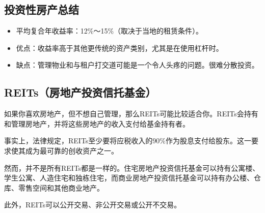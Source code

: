 \subsection{投资性房产总结}
\begin{itemize}
\item 平均复合年收益率：12\%～15\%（取决于当地的租赁条件）。
\item 优点：收益率高于其他更传统的资产类别，尤其是在使用杠杆时。
\item 缺点：管理物业和与租户打交道可能是一个令人头疼的问题。很难分散投资。
\end{itemize}
\subsection{REITs（房地产投资信托基金）}
如果你喜欢房地产，但不想自己管理，那么REITs可能比较适合你。REITs会持有和管理房地产，并将这些房地产的收入支付给基金持有者。

事实上，法律规定，REITs至少要将应税收入的90\%作为股息支付给股东。这一要求使其成为最可靠的创收资产之一。

然而，并不是所有REITs都是一样的。住宅房地产投资信托基金可以持有公寓楼、学生公寓、人造住宅和独栋住宅，而商业房地产投资信托基金可以持有办公楼、仓库、零售空间和其他商业地产。

此外，REITs可以公开交易、非公开交易或公开不交易。

